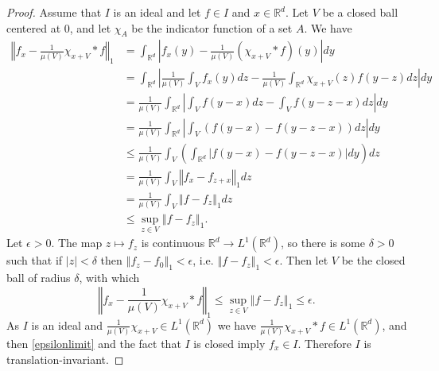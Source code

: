 \documentclass{article}
\newcommand{\norm}[1]{\left\Vert #1 \right\Vert}
\theoremstyle{definition}
\begin{document}
\begin{proof}
Assume that $I$ is an ideal and let $f \in I$ and $x \in \mathbb{R}^d$. Let $V$ be a
closed ball centered at $0$, and let $\chi_A$ be the indicator function of a set $A$. We have
\begin{align*}
\norm{f_x - \frac{1}{\mu(V)}\chi_{x+V}*f}_1&= \int_{\mathbb{R}^d} \left| f_x(y) - \frac{1}{\mu(V)} (\chi_{x+V}*f)(y) \right| dy\\
&=\int_{\mathbb{R}^d} \left| \frac{1}{\mu(V)} \int_{V} f_x(y) dz - \frac{1}{\mu(V)} \int_{\mathbb{R}^d} \chi_{x+V}(z) f(y-z) dz \right| dy\\
&=\frac{1}{\mu(V)} \int_{\mathbb{R}^d} \left| \int_{V} f(y-x) dz - \int_{V} f(y-z-x) dz \right| dy\\
&=\frac{1}{\mu(V)} \int_{\mathbb{R}^d} \left| \int_{V} (f(y-x) - f(y-z-x)) dz \right| dy\\
&\leq \frac{1}{\mu(V)} \int_{V} \left( \int_{\mathbb{R}^d} \left| f(y-x) - f(y-z-x) \right| dy \right) dz\\
&= \frac{1}{\mu(V)} \int_{V} \norm{f_x-f_{z+x}}_1 dz\\
&=\frac{1}{\mu(V)} \int_{V} \norm{f-f_z}_1 dz\\
&\leq \sup_{z \in V} \norm{f-f_z}_1.
\end{align*}
Let $\epsilon>0$.
The map $z \mapsto f_z$ is continuous $\mathbb{R}^d \to L^1(\mathbb{R}^d)$, so there is some $\delta>0$ such that if
$|z|<\delta$ then $\norm{f_z-f_0}_1<\epsilon$, i.e. $\norm{f-f_z}_1<\epsilon$. Then let $V$ be the closed ball of radius $\delta$, with which
\begin{equation}
\norm{f_x - \frac{1}{\mu(V)}\chi_{x+V}*f}_1 \leq \sup_{z \in V} \norm{f-f_z}_1 \leq \epsilon.
\label{epsilonlimit}
\end{equation}
As $I$ is an ideal and  $\frac{1}{\mu(V)}\chi_{x+V} \in L^1(\mathbb{R}^d)$ we have $\frac{1}{\mu(V)}\chi_{x+V}*f \in L^1(\mathbb{R}^d)$, and
then \eqref{epsilonlimit} and the fact that $I$ is closed imply $f_x \in I$. Therefore $I$ is translation-invariant.
\end{proof}
\end{document}
